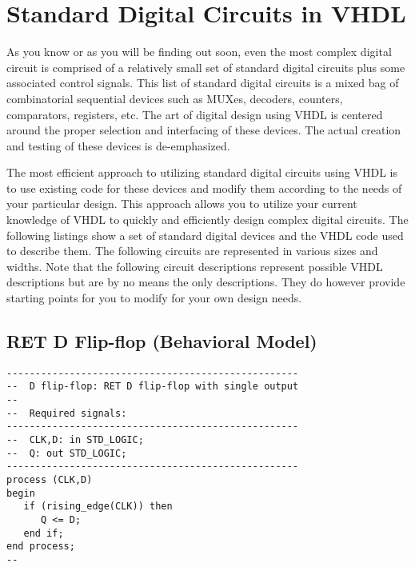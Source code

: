 %
%
%
\chapter{Standard Digital Circuits in VHDL}
As you know or as you will be finding out soon, even the most complex digital circuit is comprised of a relatively small set of standard digital circuits plus some associated control signals. This list of standard digital circuits is a mixed bag of combinatorial sequential devices such as MUXes, decoders, counters, comparators, registers, etc. The art of digital design using VHDL is centered around the proper selection and interfacing of these devices. The actual creation and testing of these devices is de-emphasized. 

The most efficient approach to utilizing standard digital circuits using VHDL is to use existing code for these devices and modify them according to the needs of your particular design. This approach allows you to utilize your current knowledge of VHDL to quickly and efficiently design complex digital circuits. The following listings show a set of standard digital devices and the VHDL code used to describe them. The following circuits are represented in various sizes and widths. Note that the following circuit descriptions represent possible VHDL descriptions but are by no means the only descriptions. They do however provide starting points for you to modify for your own design needs. 

\section{RET D Flip-flop (Behavioral Model)}
\noindent
\begin{minipage}{1\linewidth}
\begin{lstlisting}
---------------------------------------------------
--  D flip-flop: RET D flip-flop with single output
--
--  Required signals: 
---------------------------------------------------
--  CLK,D: in STD_LOGIC;
--  Q: out STD_LOGIC;
---------------------------------------------------
process (CLK,D) 
begin
   if (rising_edge(CLK)) then  
      Q <= D;
   end if;
end process;
--
\end{lstlisting}
\end{minipage}


